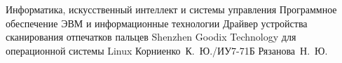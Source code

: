 \documentclass{bmstu}
\begin{document}
\makecourseworktitle
    {Информатика, искусственный интеллект и системы управления} %
    {Программное обеспечение ЭВМ и информационные технологии} %
    {Драйвер устройства сканирования отпечатков пальцев Shenzhen Goodix Technology для операционной системы Linux} %
    {Корниенко~К.~Ю./ИУ7-71Б} %
    {Рязанова~Н.~Ю.} %
    {} %

\setcounter{page}{3}



\maketableofcontents








\makebibliography
\end{document}
